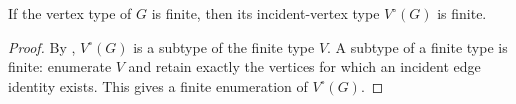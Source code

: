 \begin{lemma}
If the vertex type of $G$ is finite, then its incident-vertex type
$V^{\circ}(G)$ is finite.
\end{lemma}
\begin{proof}
By , $V^{\circ}(G)$ is a subtype of the finite type
$V$.  A subtype of a finite type is finite: enumerate $V$ and retain exactly
the vertices for which an incident edge identity exists.  This gives a finite
enumeration of $V^{\circ}(G)$.
\end{proof}
